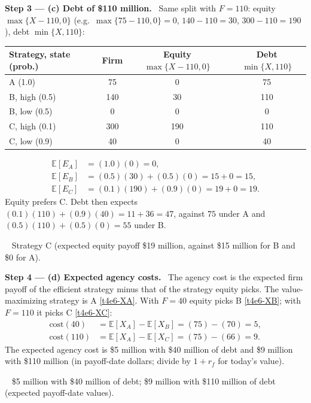 \documentclass[11pt,a4paper]{article}
\newcommand{\step}[2]{\par\medskip\noindent\textbf{Step #1 --- #2.}~}
\newcommand{\answer}[1]{\par\smallskip\noindent\fbox{\textbf{Answer #1.}}~}
\begin{document}
\step{3}{(c) Debt of \$110 million} Same split with $F=110$: equity $\max\{X-110,0\}$ (e.g.\
$\max\{75-110,0\}=0$, $140-110=30$, $300-110=190$), debt $\min\{X,110\}$:
\begin{center}
\begin{tabular}{lccc}
\toprule
Strategy, state (prob.) & Firm & Equity $\max\{X-110,0\}$ & Debt $\min\{X,110\}$\\
\midrule
A (1.0) & 75 & 0 & 75\\
B, high (0.5) & 140 & 30 & 110\\
B, low (0.5) & 0 & 0 & 0\\
C, high (0.1) & 300 & 190 & 110\\
C, low (0.9) & 40 & 0 & 40\\
\bottomrule
\end{tabular}
\end{center}
\begin{align}
  \mathbb{E}[E_A] &= (1.0)(0) = 0, \nonumber\\
  \mathbb{E}[E_B] &= (0.5)(30)+(0.5)(0) = 15+0 = 15, \nonumber\\
  \mathbb{E}[E_C] &= (0.1)(190)+(0.9)(0) = 19+0 = 19. \label{t4e6-EC110}
\end{align}
Equity prefers C. Debt then expects $(0.1)(110)+(0.9)(40)=11+36=47$, against $75$ under A and
$(0.5)(110)+(0.5)(0)=55$ under B.

\answer{(c)} Strategy C (expected equity payoff \$19 million, against \$15 million for B and
\$0 for A).

\step{4}{(d) Expected agency costs} The agency cost is the expected firm payoff of the efficient
strategy minus that of the strategy equity picks. The value-maximizing strategy is A \eqref{t4e6-XA}. With
$F=40$ equity picks B \eqref{t4e6-XB}; with $F=110$ it picks C \eqref{t4e6-XC}:
\begin{align}
  \text{cost}(40) &= \mathbb{E}[X_A]-\mathbb{E}[X_B] = (75)-(70) = 5, \label{t4e6-c40}\\
  \text{cost}(110) &= \mathbb{E}[X_A]-\mathbb{E}[X_C] = (75)-(66) = 9. \label{t4e6-c110}
\end{align}
The expected agency cost is \$5 million with \$40 million of debt and \$9 million with
\$110 million (in payoff-date dollars; divide by $1+r_f$ for today's value).

\answer{(d)} \$5 million with \$40 million of debt; \$9 million with \$110 million of debt (expected
payoff-date values).
\end{document}
